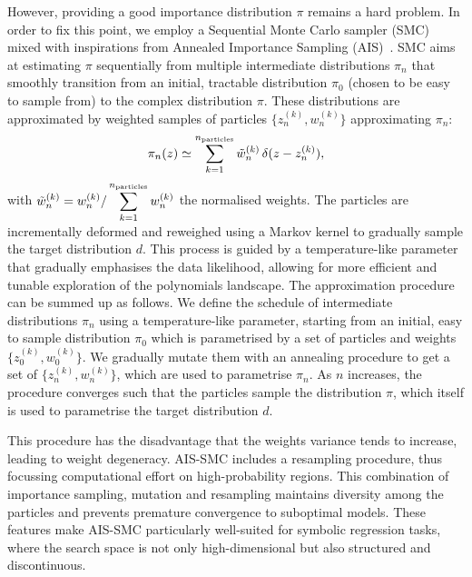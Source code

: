 \documentclass[11pt,a4paper]{article}
\begin{document}
	However, providing a good importance distribution $\pi$ remains a hard problem. In order to fix this point, we employ a Sequential Monte Carlo sampler (SMC)~\cite{del2006sequential,DoucetTutorial,naesseth2024elementssequentialmontecarlo} mixed with inspirations from Annealed Importance Sampling (AIS)~\cite{neal1998annealedimportancesampling}. SMC aims at estimating $\pi$ sequentially from multiple intermediate distributions $\pi_{n}$ that smoothly transition from an initial, tractable distribution $\pi_{0}$ (chosen to be easy to sample from) to the complex distribution $\pi$. These distributions are approximated by weighted samples of particles $\big\{z^{(k)}_{n},w^{(k)}_{n}\big\}$ approximating $\pi_{n}$:
	\begin{equation} \label{eq:pifromweights}
		\pi_{n}(z) \simeq \sum_{k=1}^{n_{\rm particles}} \tilde{w}^{(k)}_{n}\,\delta(z-z^{(k)}_{n}),
	\end{equation}
	with  $\displaystyle \tilde{w}^{(k)}_n  = w^{(k)}_n/\sum_{k=1}^{n_{\rm particles}} w^{(k)}_{n}$ the normalised weights. The particles are incrementally deformed and reweighed using a Markov kernel to gradually sample the target distribution $d$. This process is guided by a temperature-like parameter that gradually emphasises the data likelihood, allowing for more efficient and tunable exploration of the polynomials landscape. The approximation procedure can be summed up as follows. We define the schedule of intermediate distributions $\pi_{n}$ using a temperature-like parameter, starting from an initial, easy to sample distribution $\pi_0$ which is parametrised by a set of particles and weights $\big\{z_0^{(k)},w_0^{(k)}\big\}$. We gradually mutate them with an annealing procedure to get a set of $\{z_n^{(k)},w_n^{(k)}\}$, which are used to parametrise $\pi_n$. As $n$ increases, the procedure converges such that the particles sample the distribution $\pi$, which itself is used to parametrise the target distribution $d$. 
	
	This procedure has the disadvantage that the weights variance tends to increase, leading to weight degeneracy. AIS-SMC includes a resampling procedure, thus focussing computational effort on high-probability regions.  This combination of importance sampling, mutation and resampling maintains diversity among the particles and prevents premature convergence to suboptimal models. These features make AIS-SMC particularly well-suited for symbolic regression tasks, where the search space is not only high-dimensional but also structured and discontinuous.
\end{document}
